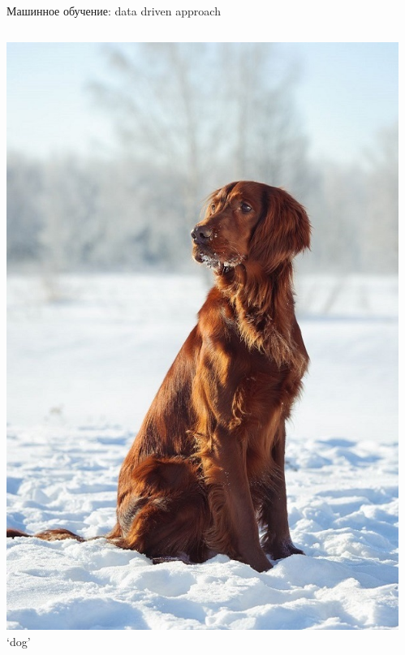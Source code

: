 \documentclass[aspectratio=169, professionalfonts]{beamer}
\begin{document}
\begin{frame}{Машинное обучение: data driven approach}
\begin{columns}
\begin{column}{.1\linewidth}
            \includegraphics[width=\linewidth]{figures/fig33-dataset-sample.jpg}
            `dog'
        \end{column}
        \begin{column}{.1\linewidth}
            \centering

\end{column}
\end{columns}
\end{frame}
\end{document}
